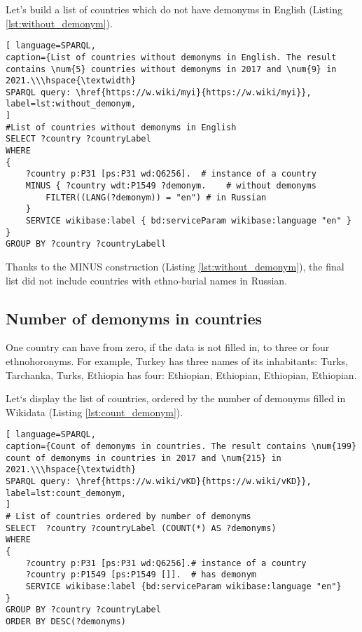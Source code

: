 Let's build a list of countries which do not have demonyms in English (Listing \ref{lst:without_demonym}).
\begin{lstlisting}[ language=SPARQL, 
caption={List of countries without demonyms in English. The result contains \num{5} countries without demonyms in 2017 and \num{9} in 2021.\\\hspace{\textwidth}
SPARQL query: \href{https://w.wiki/myi}{https://w.wiki/myi}},
label=lst:without_demonym, 
]
#List of countries without demonyms in English
SELECT ?country ?countryLabel 
WHERE
{
	?country p:P31 [ps:P31 wd:Q6256].  # instance of a country
	MINUS { ?country wdt:P1549 ?demonym.    # without demonyms
		FILTER((LANG(?demonym)) = "en") # in Russian
	}
	SERVICE wikibase:label { bd:serviceParam wikibase:language "en" }
}
GROUP BY ?country ?countryLabell
\end{lstlisting}

Thanks to the MINUS construction (Listing \ref{lst:without_demonym}), the final list did not include countries with ethno-burial names in Russian.

\subsection{Number of demonyms in countries}

One country can have from zero, if the data is not filled in, to three or four ethnohoronyms. For example, Turkey has three names of its inhabitants: Turks, Tarchanka, Turks, Ethiopia has four: Ethiopian, Ethiopian, Ethiopian, Ethiopian.

Let`s display the list of countries, ordered by the number of demonyms filled in Wikidata (Listing \ref{lst:count_demonym}).

\begin{lstlisting}[ language=SPARQL, 
caption={Count of demonyms in countries. The result contains \num{199} count of demonyms in countries in 2017 and \num{215} in 2021.\\\hspace{\textwidth}
SPARQL query: \href{https://w.wiki/vKD}{https://w.wiki/vKD}},
label=lst:count_demonym, 
]
# List of countries ordered by number of demonyms
SELECT  ?country ?countryLabel (COUNT(*) AS ?demonyms)
WHERE
{
	?country p:P31 [ps:P31 wd:Q6256].# instance of a country
	?country p:P1549 [ps:P1549 []].  # has demonym
	SERVICE wikibase:label {bd:serviceParam wikibase:language "en"}
}
GROUP BY ?country ?countryLabel 
ORDER BY DESC(?demonyms)
\end{lstlisting}


